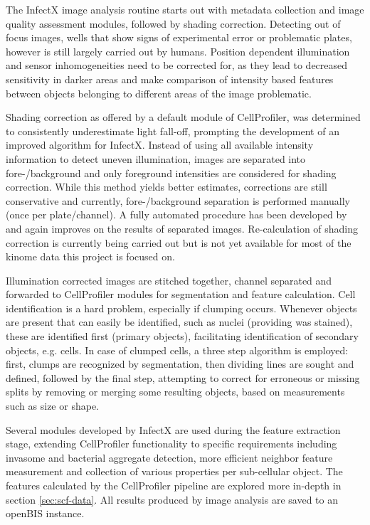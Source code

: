 The InfectX image analysis routine starts out with metadata collection and image quality assessment modules, followed by shading correction. Detecting out of focus images, wells that show signs of experimental error or problematic plates, however is still largely carried out by humans. Position dependent illumination and sensor inhomogeneities need to be corrected for, as they lead to decreased sensitivity in darker areas and make comparison of intensity based features between objects belonging to different areas of the image problematic.

Shading correction as offered by a default module of CellProfiler, was determined to consistently underestimate light fall-off, prompting the development of an improved algorithm for InfectX. Instead of using all available intensity information to detect uneven illumination, images are separated into fore-/background and only foreground intensities are considered for shading correction. While this method yields better estimates, corrections are still conservative and currently, fore-/background separation is performed manually (once per plate/channel). A fully automated procedure has been developed by \citet{Smith2015} and again improves on the results of separated images. Re-calculation of shading correction is currently being carried out but is not yet available for most of the kinome data this project is focused on.

Illumination corrected images are stitched together, channel separated and forwarded to CellProfiler modules for segmentation and feature calculation. Cell identification is a hard problem, especially if clumping occurs. Whenever objects are present that can easily be identified, such as nuclei (providing  was stained), these are identified first (primary objects), facilitating identification of secondary objects, e.g. cells. In case of clumped cells, a three step algorithm is employed: first, clumps are recognized by segmentation, then dividing lines are sought and defined, followed by the final step, attempting to correct for erroneous or missing splits by removing or merging some resulting objects, based on measurements such as size or shape.

Several modules developed by InfectX are used during the feature extraction stage, extending CellProfiler functionality to specific requirements including invasome and bacterial aggregate detection, more efficient neighbor feature measurement and collection of various properties per sub-cellular object. The features calculated by the CellProfiler pipeline are explored more in-depth in section \ref{sec:scf-data}. All results produced by image analysis are saved to an openBIS instance.

